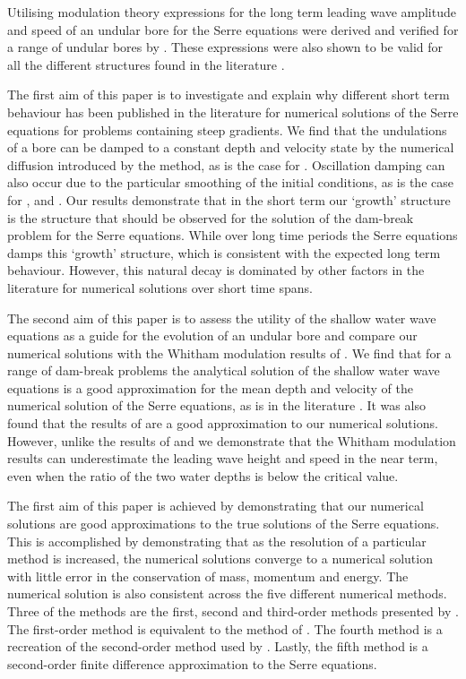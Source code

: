 \documentclass[times]{elsarticle}
\begin{document}
Utilising modulation theory expressions for the long term leading wave amplitude and speed of an undular bore for the Serre equations were derived and verified for a range of undular bores by \citet{El-etal-2006}. These expressions were also shown to be valid for all the different structures found in the literature \cite{El-etal-2006,Mitsotakis-etal-2014}.


The first aim of this paper is to investigate and explain why different short term behaviour has been published in the literature for numerical solutions of the Serre equations for problems containing steep gradients. We find that the undulations of a bore can be damped to a constant depth and velocity state by the numerical diffusion introduced by the method, as is the case for \citet{Hank-etal-2010-2034}. Oscillation damping can also occur due to the particular smoothing of the initial conditions, as is the case for \citet{Mitsotakis-etal-2017}, \citet{El-etal-2006} and \citet{Mitsotakis-etal-2014}. Our results demonstrate that in the short term our `growth' structure is the structure that should be observed for the solution of the dam-break problem for the Serre equations. While over long time periods the Serre equations damps this `growth' structure, which is consistent with the expected long term behaviour. However, this natural decay is dominated by other factors in the literature for numerical solutions over short time spans.

The second aim of this paper is to assess the utility of the shallow water wave equations as a guide for the evolution of an undular bore and compare our numerical solutions with the Whitham modulation results of \citet{El-etal-2006}. We find that for a range of dam-break problems the analytical solution of the shallow water wave equations is a good approximation for the mean depth and velocity of the numerical solution of the Serre equations, as is in the literature \cite{Hank-etal-2010-2034,Mitsotakis-etal-2014}. It was also found that the results of \citet{El-etal-2006} are a good approximation to our numerical solutions. However, unlike the results of \citet{El-etal-2006} and \citet{Mitsotakis-etal-2014} we demonstrate that the Whitham modulation results can underestimate the leading wave height and speed in the near term, even when the ratio of the two water depths is below the critical value.

The first aim of this paper is achieved by demonstrating that our numerical solutions are good approximations to the true solutions of the Serre equations. This is accomplished by demonstrating that as the resolution of a particular method is increased, the numerical solutions converge to a numerical solution with little error in the conservation of mass, momentum and energy. The numerical solution is also consistent across the five different numerical methods. Three of the methods are the first, second and third-order methods presented by \citet{Zoppou-etal-2017}. The first-order method is equivalent to the method of \citet{Hank-etal-2010-2034}. The fourth method is a recreation of the second-order method used by \citet{El-etal-2006}. Lastly, the fifth method is a second-order finite difference approximation to the Serre equations. 
\end{document}
